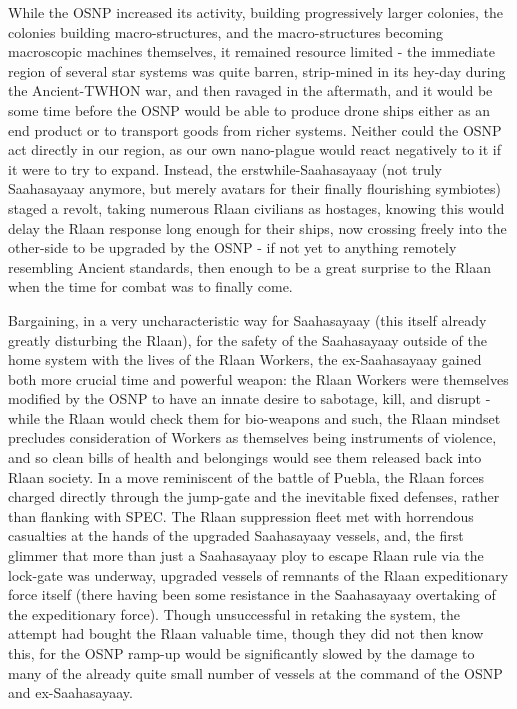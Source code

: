 While the OSNP increased its activity, building progressively larger
colonies, the colonies building macro-structures, and the
macro-structures becoming macroscopic machines themselves, it remained
resource limited - the immediate region of several star systems was
quite barren, strip-mined in its hey-day during the Ancient-TWHON war,
and then ravaged in the aftermath, and it would be some time before
the OSNP would be able to produce drone ships either as an end product
or to transport goods from richer systems. Neither could the OSNP act
directly in our region, as our own nano-plague would react negatively
to it if it were to try to expand. Instead, the erstwhile-Saahasayaay
(not truly Saahasayaay anymore, but merely avatars for their finally
flourishing symbiotes) staged a revolt, taking numerous Rlaan
civilians as hostages, knowing this would delay the Rlaan response
long enough for their ships, now crossing freely into the other-side
to be upgraded by the OSNP - if not yet to anything remotely resembling Ancient
standards, then enough to be a great surprise to the Rlaan when the
time for combat was to finally come.

Bargaining, in a very uncharacteristic way for Saahasayaay (this
itself already greatly disturbing the Rlaan), for the safety of the
Saahasayaay outside of the home system with the lives of the Rlaan
Workers, the ex-Saahasayaay gained both more crucial time and powerful
weapon: the Rlaan Workers were themselves modified by the OSNP to have
an innate desire to sabotage, kill, and disrupt - while the Rlaan
would check them for bio-weapons and such, the Rlaan mindset precludes
consideration of Workers as themselves being instruments of violence,
and so clean bills of health and belongings would see them released
back into Rlaan society. In a move reminiscent of the battle of
Puebla, the Rlaan forces charged directly through the jump-gate and
the inevitable fixed defenses, rather than flanking with SPEC. The
Rlaan suppression fleet met with horrendous casualties at the hands of
the upgraded Saahasayaay vessels, and, the first glimmer that more
than just a Saahasayaay ploy to escape Rlaan rule via the lock-gate
was underway, upgraded vessels of remnants of the Rlaan expeditionary
force itself (there having been some resistance in the Saahasayaay
overtaking of the expeditionary force). Though unsuccessful in
retaking the system, the attempt had bought the Rlaan valuable time,
though they did not then know this, for the OSNP ramp-up would be
significantly slowed by the damage to many of the already quite small
number of vessels at the command of the OSNP and ex-Saahasayaay.

